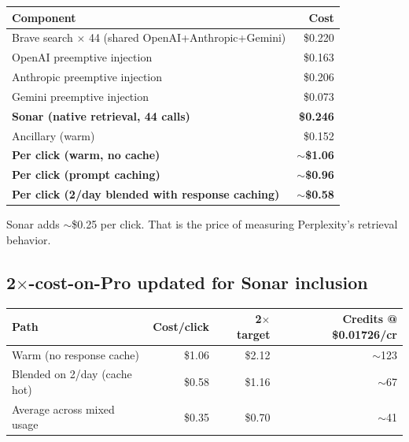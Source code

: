 \documentclass[11pt,letterpaper]{article}
\begin{document}
\begin{center}
\begin{tabular}{@{}lr@{}}
\toprule
\textbf{Component} & \textbf{Cost} \\
\midrule
Brave search $\times$ 44 (shared OpenAI+Anthropic+Gemini) & \$0.220 \\
OpenAI preemptive injection                                & \$0.163 \\
Anthropic preemptive injection                             & \$0.206 \\
Gemini preemptive injection                                & \$0.073 \\
\textbf{Sonar (native retrieval, 44 calls)}                & \textbf{\$0.246} \\
Ancillary (warm)                                           & \$0.152 \\
\midrule
\textbf{Per click (warm, no cache)}                        & \textbf{$\sim$\$1.06} \\
\textbf{Per click (prompt caching)}                        & \textbf{$\sim$\$0.96} \\
\textbf{Per click (2/day blended with response caching)}   & \textbf{$\sim$\$0.58} \\
\bottomrule
\end{tabular}
\end{center}

Sonar adds $\sim$\$0.25 per click. That is the price of measuring
Perplexity's retrieval behavior.

\subsection{2$\times$-cost-on-Pro updated for Sonar inclusion}

\begin{center}
\begin{tabular}{@{}lrrr@{}}
\toprule
\textbf{Path} & \textbf{Cost/click} & \textbf{2$\times$ target} & \textbf{Credits @ \$0.01726/cr} \\
\midrule
Warm (no response cache)            & \$1.06 & \$2.12 & $\sim$123 \\
Blended on 2/day (cache hot)        & \$0.58 & \$1.16 & $\sim$67 \\
Average across mixed usage          & \$0.35 & \$0.70 & $\sim$41 \\
\bottomrule
\end{tabular}
\end{center}
\end{document}
